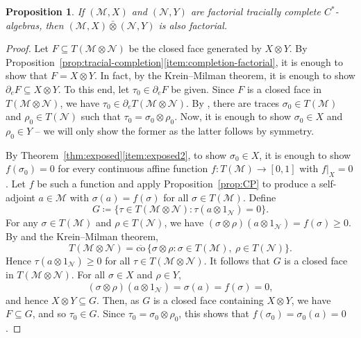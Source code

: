 \documentclass[a4paper,11pt]{amsart}
\newtheorem{proposition}[theorem]{Proposition}
\theoremstyle{definition}
\numberwithin{equation}{section}
\numberwithin{theorem}{section}
\newcommand{\M}{\mathcal{M}}
\newcommand{\barotimes}{\bar\otimes}
\begin{document}
\begin{proposition}
If $(\M, X)$ and $(\mathcal N, Y)$ are factorial tracially complete $C^*$-algebras, then $(\M, X) \barotimes (\mathcal N, Y)$ is also factorial.
\end{proposition}

\begin{proof}
Let $F \subseteq T(\M \otimes \mathcal N)$ be the closed face generated by $X \otimes Y$.  By Proposition~\ref{prop:tracial-completion}\ref{item:completion-factorial}, it is enough to show that $F = X \otimes Y$.  In fact, by the Krein--Milman theorem, it is enough to show $\partial_e F \subseteq X \otimes Y$.  To this end, let $\tau_0 \in \partial_e F$ be given.  Since $F$ is a closed face in $T(\M \otimes \mathcal N)$, we have $\tau_0 \in \partial_e T(\M \otimes \mathcal N)$.  By \cite[Proposition~3.5]{BBSTWW}, there are traces $\sigma_0 \in T(\M)$ and $\rho_0 \in T(\mathcal N)$ such that $\tau_0 = \sigma_0 \otimes \rho_0$.  Now, it is enough to show $\sigma_0 \in X$ and $\rho_0 \in Y$ -- we will only show the former as the latter follows by symmetry.

By Theorem~\ref{thm:exposed}\ref{item:exposed2}, to show $\sigma_0 \in X$, it is enough to show $f(\sigma_0) = 0$ for every continuous affine function $f \colon T(\M) \rightarrow [0, 1]$ with $f|_X = 0$.  Let $f$ be such a function and apply Proposition~\ref{prop:CP} to produce a self-adjoint $a \in \M$ with $\sigma(a) = f(\sigma)$ for all $\sigma \in T(\M)$.  Define
\begin{equation} 
G \coloneqq \{ \tau \in T(\M \otimes \mathcal N) : \tau(a \otimes 1_\mathcal N) = 0 \}. 
\end{equation}
For any $\sigma \in T(\M)$ and $\rho\in T(\mathcal{N})$, we have $(\sigma \otimes \rho)(a \otimes 1_\mathcal N) = f(\sigma) \geq 0$.
By \cite[Proposition~3.5]{BBSTWW} and the Krein--Milman theorem, 
\begin{equation}
    T(\M \otimes \mathcal N) = \overline{\mathrm{co}}\,\big\{\sigma \otimes \rho: \sigma \in T(\M),\ \rho \in T(\mathcal{N})\big\}.
\end{equation}
Hence $\tau(a \otimes 1_\mathcal N) \geq 0$ for all $\tau \in T(\M \otimes \mathcal N)$.  It follows that $G$ is a closed face in $T(\M \otimes \mathcal N)$.  For all $\sigma \in X$ and $\rho\in Y$, 
\begin{equation}
    (\sigma\otimes\rho)(a\otimes 1_{\mathcal N}) = \sigma(a) = f(\sigma) = 0,
\end{equation} 
and hence $X \otimes Y \subseteq G$.  Then, as $G$ is a closed face containing $X \otimes Y$, we have $F \subseteq G$, and so $\tau_0 \in G$. Since $\tau_0 =\sigma_0\otimes\rho_0$, this shows that $f(\sigma_0) = \sigma_0(a) = 0$.
\end{proof}
\end{document}
